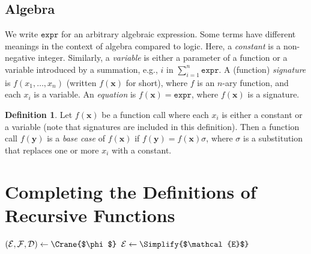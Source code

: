 \documentclass{article}
\theoremstyle{definition}
\newtheorem{definition}{Definition}
\theoremstyle{remark}
\newcommand{\expr}{\mathtt{expr}}
\begin{document}
\subsection{Algebra}\label{sec:algebra}

We write $\expr{}$ for an arbitrary algebraic expression. Some terms have
different meanings in the context of algebra compared to logic. Here, a
\emph{constant} is a non-negative integer. Similarly, a \emph{variable} is
either a parameter of a function or a variable introduced by a summation, e.g.,
$i$ in $\sum_{i=1}^{n} \expr$. A (function) \emph{signature} is
$f(x_{1}, \dots, x_{n})$ (written $f(\mathbf{x})$ for short), where $f$ is an
$n$-ary function, and each $x_{i}$ is a variable. An \emph{equation} is
$f(\mathbf{x}) = \expr{}$, where $f(\mathbf{x})$ is a signature.

\begin{definition}\label{def:basecase}
  Let $f(\mathbf{x})$ be a function call where each $x_{i}$ is either a constant
  or a variable (note that signatures are included in this definition). Then a
  function call $f(\mathbf{y})$ is a \emph{base case} of $f(\mathbf{x})$ if
  $f(\mathbf{y}) = f(\mathbf{x})\sigma$, where $\sigma$ is a substitution that
  replaces one or more $x_{i}$ with a constant.
\end{definition}

\section{Completing the Definitions of Recursive Functions}\label{sec:main}

\begin{algorithm}[t]
  \caption{\protect\CompileWithBaseCases{$\phi$}}\label{alg:compilewithbasecases}
  $(\mathcal{E}, \mathcal{F}, \mathcal{D}) \gets \Crane{$\phi$}$\;\label{line:first}
  $\mathcal{E} \gets \Simplify{$\mathcal{E}$}$\;\label{line:second}
\end{algorithm}
\end{document}
